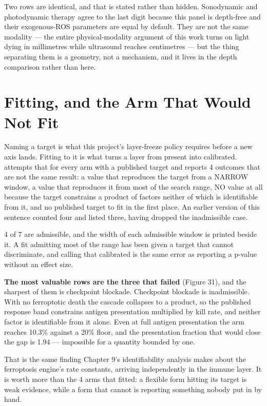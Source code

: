 \documentclass[11pt,twoside,openright]{report}
\begin{document}
Two rows are identical, and that is stated rather than hidden. Sonodynamic and photodynamic therapy agree to the last digit because this panel is depth-free and their exogenous-ROS parameters are equal by default. They are not the same modality --- the entire physical-modality argument of this work turns on light dying in millimetres while ultrasound reaches centimetres --- but the thing separating them is a geometry, not a mechanism, and it lives in the depth comparison rather than here.

\section{Fitting, and the Arm That Would Not Fit}

Naming a target is what this project's layer-freeze policy requires before a new axis lands. Fitting to it is what turns a layer from present into calibrated.  attempts that for every arm with a published target and reports 4 outcomes that are not the same result: a value that reproduces the target from a NARROW window, a value that reproduces it from most of the search range, NO value at all because the target constrains a product of factors neither of which is identifiable from it, and no published target to fit in the first place. An earlier version of this sentence counted four and listed three, having dropped the inadmissible case.

4 of 7 are admissible, and the width of each admissible window is printed beside it. A fit admitting most of the range has been given a target that cannot discriminate, and calling that calibrated is the same error as reporting a p-value without an effect size.

\textbf{The most valuable rows are the three that failed} (Figure 31), and the sharpest of them is checkpoint blockade. Checkpoint blockade is inadmissible. With no ferroptotic death the cascade collapses to a product, so the published response band constrains antigen presentation multiplied by kill rate, and neither factor is identifiable from it alone. Even at full antigen presentation the arm reaches 10.3\% against a 20\% floor, and the presentation fraction that would close the gap is 1.94 --- impossible for a quantity bounded by one.

That is the same finding Chapter 9's identifiability analysis makes about the ferroptosis engine's rate constants, arriving independently in the immune layer. It is worth more than the 4 arms that fitted: a flexible form hitting its target is weak evidence, while a form that cannot is reporting something nobody put in by hand.
\end{document}
